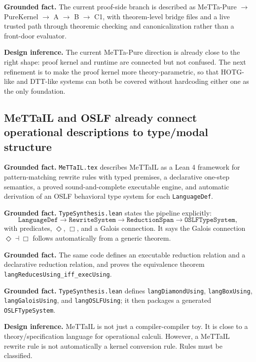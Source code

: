 \documentclass[11pt]{article}
\newcommand{\MeTTa}{\textup{MeTTa}}
\newcommand{\MeTTaIL}{\textup{MeTTaIL}}
\newcommand{\HOTG}{\textup{HOTG}}
\newcommand{\DTT}{\textup{DTT}}
\newcommand{\OSLF}{\textup{OSLF}}
\newcommand{\code}[1]{\texttt{#1}}
\newcommand{\Fact}{\textbf{Grounded fact.}}
\newcommand{\Infer}{\textbf{Design inference.}}
\begin{document}
\Fact{} The current proof-side branch is described as \MeTTa-Pure \(\to\) PureKernel \(\to\) A \(\to\) B \(\to\) C1, with theorem-level bridge files and a live trusted path through theoremic checking and canonicalization rather than a front-door evaluator.\cite{puremetta-proof}

\Infer{} The current \MeTTa-Pure direction is already close to the right shape: proof kernel and runtime are connected but not confused.  The next refinement is to make the proof kernel more theory-parametric, so that \HOTG{}-like and \DTT{}-like systems can both be covered without hardcoding either one as the only foundation.

\subsection{MeTTaIL and OSLF already connect operational descriptions to type/modal structure}

\Fact{} \code{MeTTaIL.tex} describes \MeTTaIL{} as a Lean 4 framework for pattern-matching rewrite rules with typed premises, a declarative one-step semantics, a proved sound-and-complete executable engine, and automatic derivation of an \OSLF{} behavioral type system for each \code{LanguageDef}.\cite{mettail}

\Fact{} \code{TypeSynthesis.lean} states the pipeline explicitly:
\[
\code{LanguageDef} \to \code{RewriteSystem} \to \code{ReductionSpan} \to \code{OSLFTypeSystem},
\]
with predicates, \(\Diamond\), \(\Box\), and a Galois connection.  It says the Galois connection \(\Diamond \dashv \Box\) follows automatically from a generic theorem.\cite{oslf-typesynthesis}

\Fact{} The same code defines an executable reduction relation and a declarative reduction relation, and proves the equivalence theorem \code{langReducesUsing\_iff\_execUsing}.\cite{oslf-typesynthesis}

\Fact{} \code{TypeSynthesis.lean} defines \code{langDiamondUsing}, \code{langBoxUsing}, \code{langGaloisUsing}, and \code{langOSLFUsing}; it then packages a generated \code{OSLFTypeSystem}.\cite{oslf-typesynthesis2}

\Infer{} \MeTTaIL{} is not just a compiler-compiler toy.  It is close to a theory/specification language for operational calculi.  However, a \MeTTaIL{} rewrite rule is not automatically a kernel conversion rule.  Rules must be classified.
\end{document}
